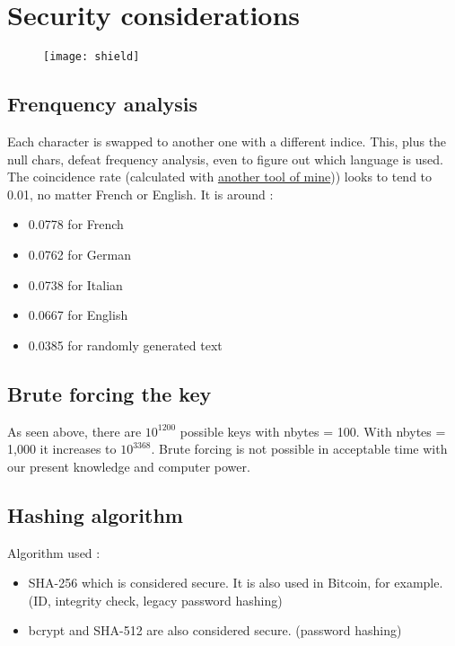 \section{Security considerations}

\begin{figure}[H]
    \centering
    \texttt{[image: shield]}
\end{figure}

\subsection{Frenquency analysis}

Each character is swapped to another one with a different indice. This, plus the null chars, defeat frequency analysis, even to figure out which language is used.
\newline
The coincidence rate (calculated with \href{https://github.com/Lcram33/frequency_analysis}{another tool of mine})) looks to tend to 0.01, no matter French or English.
\newline
\newline
It is around :
\begin{itemize}
    \item 0.0778 for French
    \item 0.0762 for German
    \item 0.0738 for Italian
    \item 0.0667 for English
    \item 0.0385 for randomly generated text
\end{itemize}

\subsection{Brute forcing the key}

As seen above, there are $10^{1200}$ possible keys with nbytes = 100. With nbytes = 1,000 it increases to $10^{3368}$.
\newline
Brute forcing is not possible in acceptable time with our present knowledge and computer power.

\subsection{Hashing algorithm}

Algorithm used :
\begin{itemize}
    \item SHA-256 which is considered secure. It is also used in Bitcoin, for example. (ID, integrity check, legacy password hashing)
    \item bcrypt and SHA-512 are also considered secure. (password hashing)
\end{itemize}